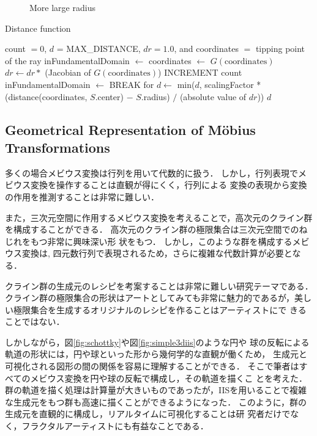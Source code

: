 \begin{figure}[htbp]
\begin{minipage}{0.5\hsize}
\begin{minipage}{0.24\hsize}
  \end{minipage}
 \hspace*{\fill}
  \caption{More large radius}
  \label{fig:limitObj}
 \end{minipage}
\end{figure}

\begin{algorithm}
 \caption{Distance function}
 \label{alg:iis3d}
 \begin{algorithmic}
  \REQUIRE count $= 0$, $d$ = MAX\_DISTANCE, $dr = 1.0$, and coordinates $=$ tipping
  point of the ray
  \STATE inFundamentalDomain $\leftarrow$ \TRUE
  \STATE coordinates $\leftarrow$ $G(\text{coordinates})$
  \STATE $dr \leftarrow dr * $ (Jacobian of $G(\text{coordinates})$)
  \STATE INCREMENT count
  \STATE inFundamentalDomain $\leftarrow$ \FALSE
  \ENDIF
  \ENDFOR
  \STATE BREAK for
  \ENDIF
  \ENDFOR
  \STATE $d \leftarrow$ min($d$, scalingFactor * (distance(coordinates, $S$.center) $-$
  $S$.radius) $/$ (absolute value of $dr$))
  \ENDFOR
  \RETURN $d$
 \end{algorithmic}
\end{algorithm}

\subsection{Geometrical Representation of M\"obius Transformations}

多くの場合メビウス変換は行列を用いて代数的に扱う．
しかし，行列表現でメビウス変換を操作することは直観が得にくく，行列による
変換の表現から変換の作用を推測することは非常に難しい．

また，三次元空間に作用するメビウス変換を考えることで，高次元のクライン群
を構成することができる．
高次元のクライン群の極限集合は三次元空間でのねじれをもつ非常に興味深い形
状をもつ．
しかし，このような群を構成するメビウス変換は,
四元数行列で表現されるため，さらに複雑な代数計算が必要となる．

クライン群の生成元のレシピを考案することは非常に難しい研究テーマである．
クライン群の極限集合の形状はアートとしてみても非常に魅力的であるが，美し
い極限集合を生成するオリジナルのレシピを作ることはアーティストにで
きることではない．

しかしながら，図\ref{fig:schottky}や図\ref{fig:simple3diis}のような円や
球の反転による軌道の形状には，円や球といった形から幾何学的な直観が働くため，
生成元と可視化される図形の間の関係を容易に理解することができる．
そこで筆者はすべてのメビウス変換を円や球の反転で構成し，その軌道を描くこ
とを考えた．
群の軌道を描く処理は計算量が大きいものであったが，IISを用いることで複雑
な生成元をもつ群も高速に描くことができるようになった．
このように，群の生成元を直観的に構成し，リアルタイムに可視化することは研
究者だけでなく，フラクタルアーティストにも有益なことである．

